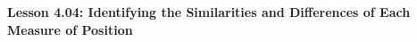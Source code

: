 \begin{center}
\textbf{Lesson 4.04: Identifying the Similarities and Differences of Each Measure of Position}
\end{center}

\vspace*{-1.5ex}

